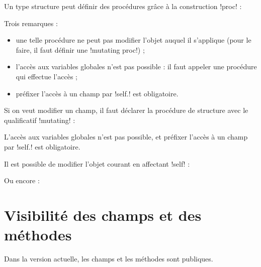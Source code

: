 
Un type structure peut définir des procédures grâce à la construction \plm!proc! :


Trois remarques :
\begin{itemize}
  \item une telle procédure ne peut pas modifier l'objet auquel il s'applique (pour le faire, il faut définir une \plm!mutating proc!) ;
  \item l'accès aux variables globales n'est pas possible : il faut appeler une procédure qui effectue l'accès ;
  \item préfixer l'accès à un champ par \plm!self.! est obligatoire. 
\end{itemize}





Si on veut modifier un champ, il faut déclarer la procédure de structure avec le qualificatif \plm!mutating! :


L'accès aux variables globales n'est pas possible, et préfixer l'accès à un champ par \plm!self.! est obligatoire. 

Il est possible de modifier l'objet courant en affectant \plm!self! :


Ou encore :















\section{Visibilité des champs et des méthodes}

Dans la version actuelle, les champs et les méthodes sont publiques.


